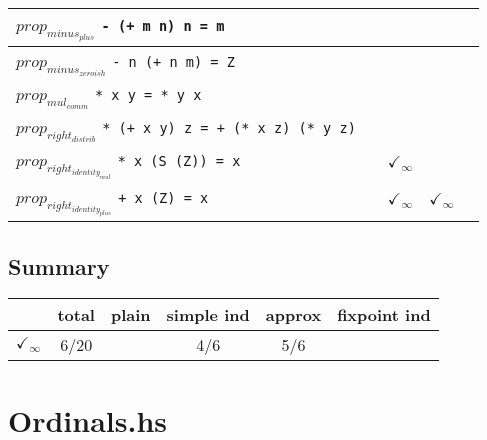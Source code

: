 \documentclass{article}
\begin{document}
\begin{longtable}{p{10cm} || c | c | c | c | }
\hline
$prop_{minus_{plus}}$ \newline \verb`- (+ m n) n = m` &  &  &  &  \\
\hline
$prop_{minus_{zeroish}}$ \newline \verb`- n (+ n m) = Z` &  &  &  &  \\
\hline
$prop_{mul_{comm}}$ \newline \verb`* x y = * y x` &  &  &  &  \\
\hline
$prop_{right_{distrib}}$ \newline \verb`* (+ x y) z = + (* x z) (* y z)` &  &  &  &  \\
\hline
$prop_{right_{identity_{mul}}}$ \newline \verb`* x (S (Z)) = x` &  & $\checkmark_{\infty}$ &  &  \\
\hline
$prop_{right_{identity_{plus}}}$ \newline \verb`+ x (Z) = x` &  & $\checkmark_{\infty}$ & $\checkmark_{\infty}$ &  \\
\end{longtable}

\subsection*{Summary}
\begin{longtable}{p{4cm} || c | c | c | c | c | }
  & total & plain & simple ind & approx & fixpoint ind \\
\hline
$\checkmark_{\infty}$ & 6/20 &  & 4/6 & 5/6 & \\
\end{longtable}

\section*{Ordinals.hs}
\end{document}
